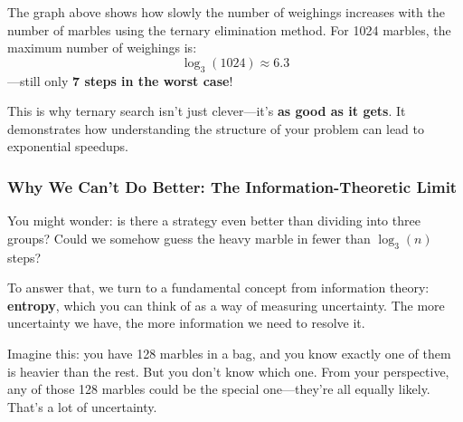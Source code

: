 \begin{center}
\end{center}



\noindent The graph above shows how slowly the number of weighings increases with the number of marbles using the ternary elimination method. For 1024 marbles, the maximum number of weighings is:
\[
\log_3(1024) \approx 6.3
\]
—still only \textbf{7 steps in the worst case}!

\medskip

This is why ternary search isn’t just clever—it’s \textbf{as good as it gets}. It demonstrates how understanding the structure of your problem can lead to exponential speedups.

\subsubsection{Why We Can't Do Better: The Information-Theoretic Limit}

You might wonder: is there a strategy even better than dividing into three groups? Could we somehow guess the heavy marble in fewer than \( \log_3(n) \) steps?

To answer that, we turn to a fundamental concept from information theory: \textbf{entropy}, which you can think of as a way of measuring uncertainty. The more uncertainty we have, the more information we need to resolve it.

Imagine this: you have 128 marbles in a bag, and you know exactly one of them is heavier than the rest. But you don’t know which one. From your perspective, any of those 128 marbles could be the special one—they’re all equally likely. That’s a lot of uncertainty.

